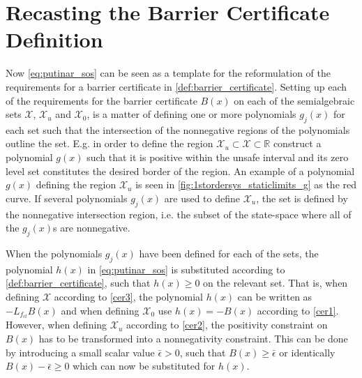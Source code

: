 \section{Recasting the Barrier Certificate Definition}
\vspace{-2mm}
Now \autoref{eq:putinar_sos} can be seen as a template for the reformulation of the requirements for a barrier certificate in \autoref{def:barrier_certificate}.
Setting up each of the requirements for the barrier certificate $B(x)$ on each of the  semialgebraic sets $\mathcal{X}$, $\mathcal{X}_u$ and $\mathcal{X}_0$, is a matter of defining one or more polynomials $g_j(x)$ for each set such that the intersection of the nonnegative regions of the polynomials outline the set.
E.g. in order to define the region $\mathcal{X}_u\subset\mathcal{X}\subset\mathbb{R}$ construct a polynomial $g(x)$ such that it is positive within the unsafe interval and its zero level set constitutes the desired border of the region. An example of a polynomial $g(x)$ defining the region $\mathcal{X}_u$ is seen in \autoref{fig:1stordersys_staticlimits_g} as the red curve. If several polynomials $g_j(x)$ are used to define $\mathcal{X}_u$, the set is defined by the nonnegative intersection region, i.e. the subset of the state-space where all of the $g_j(x)$s are nonnegative.

When the polynomials $g_j(x)$ have been defined for each of the sets, the polynomial $h(x)$ in \autoref{eq:putinar_sos} is substituted according to \autoref{def:barrier_certificate}, such that $h(x)\geq 0$ on the relevant set. That is, when defining $\mathcal{X}$ according to \autoref{cer3}, the polynomial $h(x)$ can be written as $-L_{f_{cl}}B(x)$ and when defining $\mathcal{X}_0$ use $h(x)=-B(x)$ according to \autoref{cer1}. However, when defining $\mathcal{X}_u$ according to \autoref{cer2}, the positivity constraint on $B(x)$ has to be transformed into a nonnegativity constraint. This can be done by introducing a small scalar value $\bar{\epsilon}>0$, such that $B(x)\geq \bar{\epsilon} $ or identically $B(x)-\bar{\epsilon}\geq 0$ which can now be substituted for $h(x)$.

